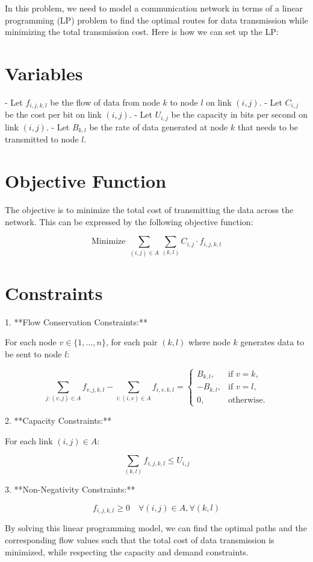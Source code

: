 \documentclass{article}
\begin{document}
In this problem, we need to model a communication network in terms of a linear programming (LP) problem to find the optimal routes for data transmission while minimizing the total transmission cost. Here is how we can set up the LP:

\section*{Variables}
- Let $f_{i,j,k,l}$ be the flow of data from node $k$ to node $l$ on link $(i, j)$.
- Let $C_{i,j}$ be the cost per bit on link $(i, j)$.
- Let $U_{i,j}$ be the capacity in bits per second on link $(i, j)$.
- Let $B_{k,l}$ be the rate of data generated at node $k$ that needs to be transmitted to node $l$.

\section*{Objective Function}
The objective is to minimize the total cost of transmitting the data across the network. This can be expressed by the following objective function:

\[
\text{Minimize } \sum_{(i,j) \in A} \sum_{(k,l)} C_{i,j} \cdot f_{i,j,k,l}
\]

\section*{Constraints}
1. **Flow Conservation Constraints:**

   For each node $v \in \{1, \ldots, n\}$, for each pair $(k, l)$ where node $k$ generates data to be sent to node $l$:

   \[
   \sum_{j: (v,j) \in A} f_{v,j,k,l} - \sum_{i: (i,v) \in A} f_{i,v,k,l} =
   \begin{cases} 
   B_{k,l}, & \text{if } v = k, \\
   -B_{k,l}, & \text{if } v = l, \\
   0, & \text{otherwise.}
   \end{cases}
   \]

2. **Capacity Constraints:**

   For each link $(i,j) \in A$:

   \[
   \sum_{(k,l)} f_{i,j,k,l} \leq U_{i,j}
   \]

3. **Non-Negativity Constraints:**

   \[
   f_{i,j,k,l} \geq 0 \quad \forall (i,j) \in A, \forall (k,l)
   \]

By solving this linear programming model, we can find the optimal paths and the corresponding flow values such that the total cost of data transmission is minimized, while respecting the capacity and demand constraints.
\end{document}
